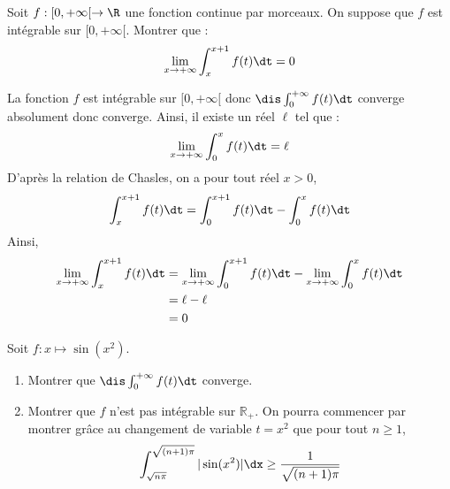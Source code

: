 \documentclass[a4paper,10pt]{report}
\begin{document}
\begin{Exa}  Soit $f :[0, + \infty[ \rightarrow \R$ une fonction continue par morceaux.  On suppose que $f$ est intégrable sur $[0, + \infty[$.  Montrer que :
  \[
  \lim_{x \rightarrow + \infty} \int_{x}^{x + 1} f(t) \dt =0 
  \]
\end{Exa}

\corr La fonction $f$ est intégrable sur $[0, + \infty[$ donc $\dis \int_0^{+ \infty} f(t) \dt$ converge absolument donc converge. Ainsi, il existe un réel $\ell$ tel que :
$$ \lim_{x \rightarrow + \infty} \int_0^x f(t) \dt = \ell$$
D'après la relation de Chasles, on a pour tout réel $x>0$,
$$ \int_{x}^{x + 1} f(t) \dt = \int_{0}^{x + 1} f(t) \dt - \int_{0}^{x} f(t) \dt $$
Ainsi,
\begin{align*}
\lim_{x \rightarrow + \infty} \int_{x}^{x + 1} f(t) \dt & =\lim_{x \rightarrow + \infty}  \int_{0}^{x + 1} f(t) \dt - \lim_{x \rightarrow + \infty} \int_{0}^{x} f(t) \dt \\
& = \ell - \ell \\
& = 0
\end{align*}

\begin{Exa}
Soit $f : x \mapsto \sin(x^2)$.
\begin{enumerate}
\item Montrer que $\dis \int_{0}^{+ \infty}  f(t) \dt$ converge.
\item Montrer que $f$ n'est pas intégrable sur $\mathbb{R}_+$. On pourra commencer par montrer grâce au changement de variable $t=x^2$ que pour tout $n \geq 1$,
$$ \int_{\sqrt{n \pi}}^{\sqrt{(n+1)\pi}} \vert \sin(x^2) \vert \dx \geq \frac{1}{\sqrt{(n+1) \pi}}$$
\end{enumerate}
\end{Exa}

\corr 
\end{document}
